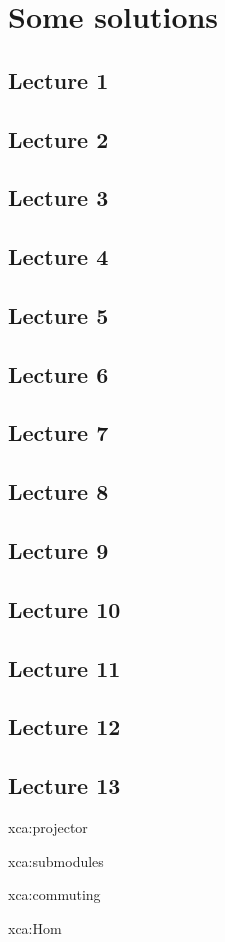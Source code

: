 \chapter{Some solutions}

\section*{Lecture 1}
\section*{Lecture 2}
\section*{Lecture 3}
\section*{Lecture 4}
\section*{Lecture 5}
\section*{Lecture 6}
\section*{Lecture 7}
\section*{Lecture 8}
\section*{Lecture 9}
\section*{Lecture 10}
\section*{Lecture 11}
\section*{Lecture 12}
\section*{Lecture 13}

\begin{sol}{xca:projector}
\end{sol}

\begin{sol}{xca:submodules}
\end{sol}

\begin{sol}{xca:commuting}
\end{sol}

\begin{sol}{xca:Hom}
\end{sol}

